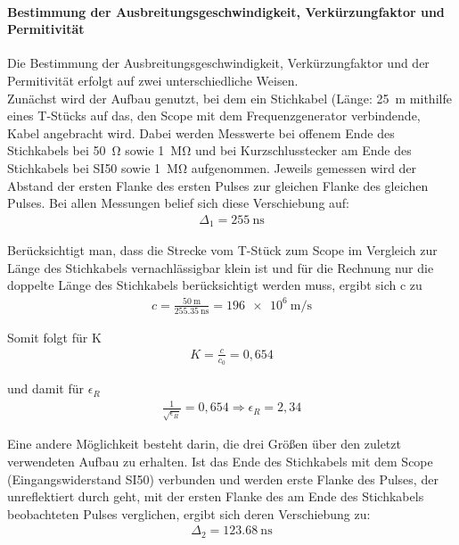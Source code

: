 \documentclass[a4paper,twoside,final]{article}
\begin{document}
\paragraph{Bestimmung der Ausbreitungsgeschwindigkeit, Verkürzungfaktor und Permitivität}
Die Bestimmung der Ausbreitungsgeschwindigkeit, Verkürzungfaktor und der Permitivität erfolgt auf zwei unterschiedliche Weisen. \\
Zunächst wird der Aufbau genutzt, bei dem ein Stichkabel (Länge: \SI{25}{\meter} mithilfe eines T-Stücks auf das, den Scope mit dem Frequenzgenerator verbindende, Kabel angebracht wird. Dabei werden Messwerte bei offenem Ende des Stichkabels bei \SI{50}{\ohm} sowie \SI{1}{\mega\ohm} und bei Kurzschlusstecker am Ende des Stichkabels bei SI{50}{\ohm} sowie \SI{1}{\mega\ohm} aufgenommen. Jeweils gemessen wird der Abstand der ersten Flanke des ersten Pulses zur gleichen Flanke des gleichen Pulses. Bei allen Messungen belief sich diese Verschiebung auf:
\begin{align}
\Delta_1 = \SI{255}{\nano\second}
\end{align}

Berücksichtigt man, dass die Strecke vom T-Stück zum Scope im Vergleich zur Länge des Stichkabels vernachlässigbar klein ist und für die Rechnung nur die doppelte Länge des Stichkabels berücksichtigt werden muss, ergibt sich c zu
\begin{align}
c = \frac{\SI{50}{\meter}}{\SI{255,35}{\nano\second}} = \SI{196e6}{\meter\per\second}
\end{align}

Somit folgt für K
\begin{align}
K = \frac{c}{c_0} = 0,654
\end{align}

und damit für $\epsilon_R$
\begin{align}
\frac{1}{\sqrt{\epsilon_R}} = 0,654 \Rightarrow \epsilon_R = 2,34
\end{align}

Eine andere Möglichkeit besteht darin, die drei Größen über den zuletzt verwendeten Aufbau zu erhalten. Ist das Ende des Stichkabels mit dem Scope (Eingangswiderstand SI{50}{\ohm}) verbunden und werden erste Flanke des Pulses, der unreflektiert durch geht, mit der ersten Flanke des am Ende des Stichkabels beobachteten Pulses verglichen, ergibt sich deren Verschiebung zu:
\begin{align}
\Delta_2  = \SI{123,68}{\nano\second}
\end{align}
\end{document}
